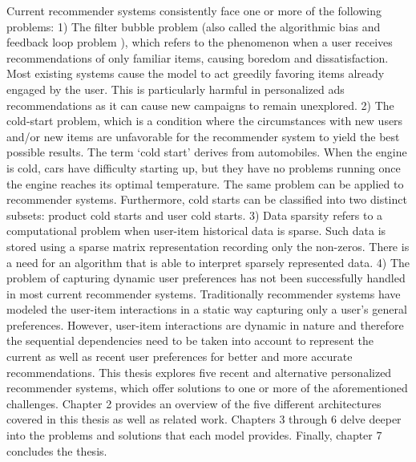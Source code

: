 Current recommender systems consistently face one or more of the following problems: 1) The filter bubble problem (also called the algorithmic bias and feedback loop problem ), which refers to the phenomenon when a user receives recommendations of only familiar items, causing boredom and dissatisfaction. Most existing systems cause the model to act greedily favoring items already engaged by the user. This is particularly harmful in personalized ads recommendations as it can cause new campaigns to remain unexplored. 2) The cold-start problem, which is a condition where the circumstances  with new users and/or new items are unfavorable for the recommender system to yield the best possible results. The term ‘cold start’ derives from automobiles. When the engine is cold, cars have difficulty starting up, but they have no problems running once the engine reaches its optimal temperature. The same problem can be applied to recommender systems. Furthermore, cold starts can be classified into two distinct subsets: product cold starts and user cold starts. 3) Data sparsity refers to a computational problem  when user-item historical data is sparse. Such data is stored using a sparse matrix representation recording only the non-zeros. There is a need for an algorithm that is able to interpret sparsely represented data. 4) The problem of capturing dynamic user preferences has not been successfully handled in most current recommender systems. Traditionally recommender systems have modeled the user-item interactions in a static way capturing only a user’s general preferences. However, user-item interactions are dynamic in nature and therefore the sequential dependencies need to be taken into account to represent the current as well as recent user preferences for better and more accurate recommendations. This thesis explores five recent and alternative personalized recommender systems, which offer solutions to one or more of the aforementioned challenges. Chapter 2 provides an overview of the five different architectures covered in this thesis as well as related work. Chapters 3 through 6 delve deeper into the problems and solutions that each model provides. Finally, chapter 7 concludes the thesis.
